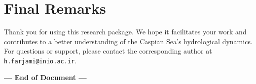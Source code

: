 \documentclass[12pt,a4paper]{article}
\begin{document}
\section*{Final Remarks}
Thank you for using this research package. We hope it facilitates your work and contributes to a better understanding of the Caspian Sea's hydrological dynamics. For questions or support, please contact the corresponding author at \texttt{h.farjami@inio.ac.ir}.

\vspace{1cm}
\hfill \textbf{— End of Document —}
\end{document}
